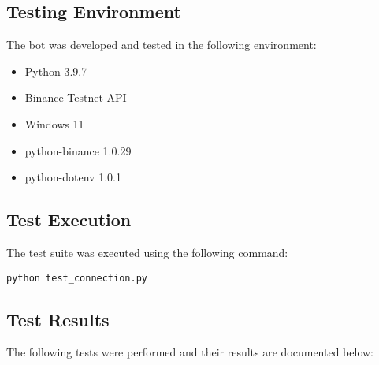 \documentclass[12pt,a4paper]{article}
\begin{document}
\subsection{Testing Environment}
The bot was developed and tested in the following environment:
\begin{itemize}
    \item Python 3.9.7
    \item Binance Testnet API
    \item Windows 11
    \item python-binance 1.0.29
    \item python-dotenv 1.0.1
\end{itemize}

\subsection{Test Execution}
The test suite was executed using the following command:
\begin{verbatim}
python test_connection.py
\end{verbatim}

\subsection{Test Results}
The following tests were performed and their results are documented below:
\end{document}
